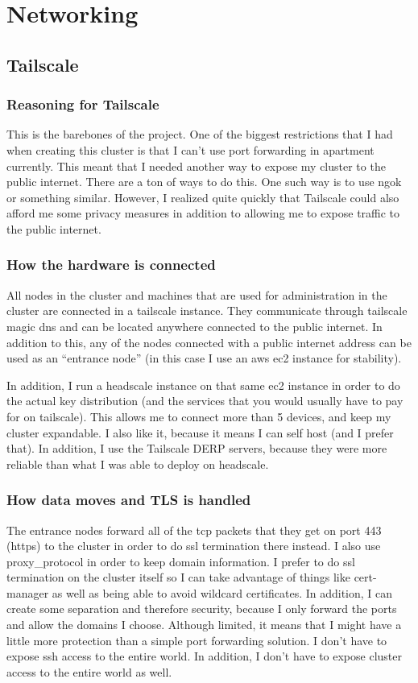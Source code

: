 \documentclass[12pt]{article}
\begin{document}
\section{Networking}
\subsection{Tailscale}
\subsubsection{Reasoning for Tailscale}
This is the barebones of the project. One of the biggest restrictions that I had when creating this cluster is that I can't use port forwarding in apartment currently. This meant that I needed another way to expose my cluster to the public internet. There are a ton of ways to do this. One such way is to use ngok or something similar. However, I realized quite quickly that Tailscale could also afford me some privacy measures in addition to allowing me to expose traffic to the public internet.

\subsubsection{How the hardware is connected}
All nodes in the cluster and machines that are used for administration in the cluster are connected in a tailscale instance. They communicate through tailscale magic dns and can be located anywhere connected to the public internet. In addition to this, any of the nodes connected with a public internet address can be used as an ``entrance node'' (in this case I use an aws ec2 instance for stability).

In addition, I run a headscale instance on that same ec2 instance in order to do the actual key distribution (and the services that you would usually have to pay for on tailscale). This allows me to connect more than 5 devices, and keep my cluster expandable. I also like it, because it means I can self host (and I prefer that). In addition, I use the Tailscale DERP servers, because they were more reliable than what I was able to deploy on headscale.

\subsubsection{How data moves and TLS is handled}
The entrance nodes forward all of the tcp packets that they get on port 443 (https) to the cluster in order to do ssl termination there instead. I also use proxy\_protocol in order to keep domain information. I prefer to do ssl termination on the cluster itself so I can take advantage of things like cert-manager as well as being able to avoid wildcard certificates. In addition, I can create some separation and therefore security, because I only forward the ports and allow the domains I choose. Although limited, it means that I might have a little more protection than a simple port forwarding solution. I don't have to expose ssh access to the entire world. In addition, I don't have to expose cluster access to the entire world as well.
\end{document}
